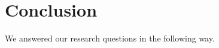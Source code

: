 \chapter{Conclusion}
\label{chapter:conclusion}

We answered our research questions in the following way.

